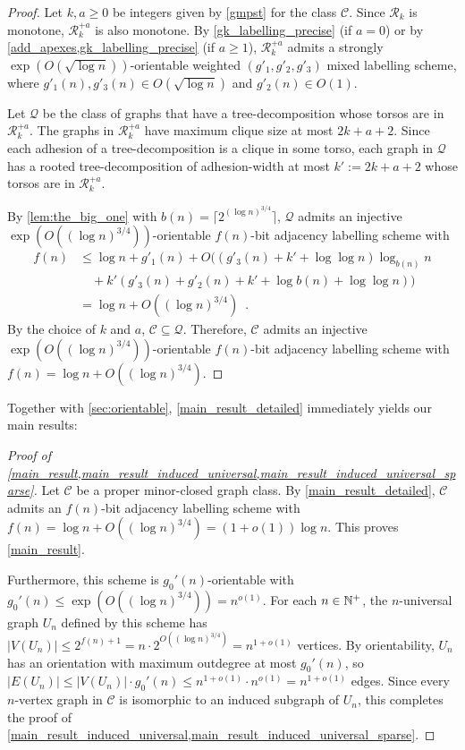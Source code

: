 \documentclass{patmorin}
\renewcommand{\ge}{\geqslant}
\renewcommand{\le}{\leqslant}
\renewcommand{\geq}{\geqslant}
\newcommand{\Oh}{O}
\newcommand{\calC}{\mathcal{C}}
\newcommand{\calQ}{\mathcal{Q}}
\newcommand{\calR}{\mathcal{R}}
\begin{document}
\begin{proof}
  Let $k,a\geq 0$ be integers given by \cref{gmpst} for the class $\calC$.  
  Since $\calR_k$ is monotone, $\calR_k^{+a}$ is also monotone.
  By \cref{gk_labelling_precise} (if $a=0$) or by \cref{add_apexes,gk_labelling_precise} (if $a\ge 1$), $\calR_k^{+a}$ admits a strongly $\exp(\Oh(\sqrt{\log n}))$-orientable weighted $(g'_1,g'_2,g'_3)$ mixed labelling scheme, where $g'_1(n),g'_3(n)\in \Oh(\sqrt{\log n})$ and $g'_2(n)\in \Oh(1)$.

  Let $\calQ$ be the class of graphs that have a tree-decomposition whose torsos are in $\calR_k^{+a}$. The graphs in $\calR_k^{+a}$ have maximum clique size at most $2k+a+2$. Since each adhesion of a tree-decomposition is a clique in some torso, each graph in $\calQ$ has a rooted tree-decomposition of adhesion-width at most $k':=2k+a+2$ whose torsos are in $\calR_k^{+a}$.

  By \cref{lem:the_big_one} with $b(n)=\lceil 2^{(\log n)^{3/4}} \rceil$, $\calQ$ admits an injective $\exp(\Oh((\log n)^{3/4}))$-orientable $f(n)$-bit adjacency labelling scheme with
  \begin{align*}
    f(n) 
      & \le \log n + g'_1(n) + \Oh\big((g'_3(n) + k' + \log\log n)\log_{b(n)} n \\ & \quad {} + k'(g'_3(n) + g'_2(n) + k' + \log b(n) + \log\log n)\big) \\
      & = \log n + \Oh((\log n)^{3/4}) \enspace.
  \end{align*}
  By the choice of $k$ and $a$, $\calC\subseteq\calQ$.  Therefore, $\calC$ admits an injective $\exp(\Oh((\log n)^{3/4}))$-orientable $f(n)$-bit adjacency labelling scheme with $f(n)=\log n + \Oh((\log n)^{3/4})$.
\end{proof}

Together with \cref{sec:orientable}, \cref{main_result_detailed} immediately yields our main results:

\begin{proof}[Proof of \cref{main_result,main_result_induced_universal,main_result_induced_universal_sparse}]
  Let $\calC$ be a proper minor-closed graph class. By \cref{main_result_detailed}, $\calC$ admits an $f(n)$-bit adjacency labelling scheme with $f(n)=\log n + \Oh((\log n)^{3/4}) = (1+o(1))\log n$. This proves \cref{main_result}.

  Furthermore, this scheme is $g_0'(n)$-orientable with $g_0'(n) \le \exp(\Oh((\log n)^{3/4})) = n^{o(1)}$. For each $n\in\mathbb{N}^+$, the $n$-universal graph $U_n$ defined by this scheme has $|V(U_n)| \le 2^{f(n)+1} = n\cdot 2^{\Oh((\log n)^{3/4})} = n^{1+o(1)}$ vertices. By orientability, $U_n$ has an orientation with maximum outdegree at most $g_0'(n)$, so $|E(U_n)| \le |V(U_n)|\cdot g_0'(n) \le n^{1+o(1)}\cdot n^{o(1)} = n^{1+o(1)}$ edges. Since every $n$-vertex graph in $\calC$ is isomorphic to an induced subgraph of $U_n$, this completes the proof of \cref{main_result_induced_universal,main_result_induced_universal_sparse}.
\end{proof}
\end{document}
